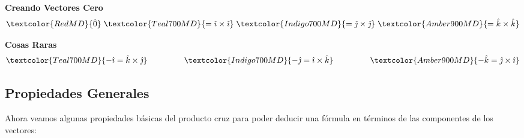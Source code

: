 \documentclass[12pt, fleqn]{report}                             %
\DeclareMathOperator \MegaSpace {\quad \quad}                   %
\theoremstyle{break}                                            %
\newcommand{\hati} {\hat{\imath}}                               %
\newcommand{\hatj} {\hat{\jmath}}                               %
\newcommand{\hatk} {\hat{k}}                                    %
\begin{document}
                \textbf{Creando Vectores Cero}
                    \begin{align*}
                        \textcolor{RedMD}
                            {\hat{0}}
                            \;
                        \textcolor{Teal700MD}
                            { = \hati \times \hati}
                            \;
                        \textcolor{Indigo700MD}
                            { = \hatj \times \hatj}
                            \;
                        \textcolor{Amber900MD}
                            { = \hatk \times \hatk}
                    \end{align*}

                \textbf{Cosas Raras}
                    \begin{align*}
                        \textcolor{Teal700MD}
                        {-\hati = \hatk \times \hatj}
                            \MegaSpace \MegaSpace
                        \textcolor{Indigo700MD}
                        {-\hatj = \hati \times \hatk}
                            \MegaSpace \MegaSpace
                        \textcolor{Amber900MD}
                        {-\hatk = \hatj \times \hati}
                    \end{align*}
                    


            \clearpage
            \subsection{Propiedades Generales}

                Ahora veamos algunas propiedades básicas del producto cruz para poder deducir una fórmula
                en términos de las componentes de los vectores:
                
\end{document}
